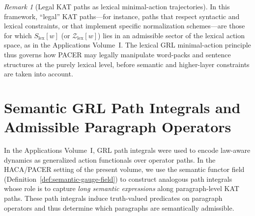 \documentclass[11pt]{book}
\theoremstyle{plain}
\theoremstyle{definition}
\theoremstyle{remark}
\newtheorem{remark}[theorem]{Remark}
\begin{document}
\begin{remark}[Legal KAT paths as lexical minimal-action trajectories]
\label{rem:legal-kat-paths-minimal-action}
In this framework, ``legal'' KAT paths—for instance, paths that
respect syntactic and lexical constraints, or that implement specific
normalization schemes—are those for which $S_{\mathrm{lex}}[w]$ (or
$\mathcal{Z}_{\mathrm{lex}}[w]$) lies in an admissible sector of the
lexical action space, as in the Applications Volume~I. The lexical
GRL minimal-action principle thus governs how PACER may legally
manipulate word-packs and sentence structures at the purely lexical
level, before semantic and higher-layer constraints are taken into
account.
\end{remark}

\section[Semantic GRL Path Integrals and Admissible Paragraph Operators]{Semantic GRL Path Integrals and Admissible Paragraph Operators}
\label{subsec:semantic-grl-path-integral-haca}


In the Applications Volume~I, GRL path integrals were used to encode
law-aware dynamics as generalized action functionals over operator
paths. In the HACA/PACER setting of the present volume, we use the
semantic functor field
(Definition~\ref{def:semantic-gauge-field}) to construct analogous
path integrals whose role is to capture \emph{long semantic
expressions} along paragraph-level KAT paths. These path integrals
induce truth-valued predicates on paragraph operators and thus
determine which paragraphs are semantically admissible.
\end{document}

